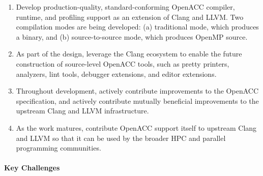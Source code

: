 \begin{enumerate}

\item Develop production-quality, standard-conforming OpenACC
compiler, runtime, and profiling support as an extension of Clang and
LLVM.  Two compilation modes are being developed: (a) traditional
mode, which produces a binary, and (b) source-to-source mode, which
produces OpenMP source.

\item As part of the design, leverage the Clang ecosystem to enable
the future construction of source-level OpenACC tools, such as pretty
printers, analyzers, lint tools, debugger extensions, and editor
extensions.

\item Throughout development, actively contribute improvements to the
OpenACC specification, and actively contribute mutually beneficial
improvements to the upstream Clang and LLVM infrastructure.

\item As the work matures, contribute OpenACC support itself to
upstream Clang and LLVM so that it can be used by the broader HPC and
parallel programming communities.

\end{enumerate}

\paragraph{Key Challenges}

